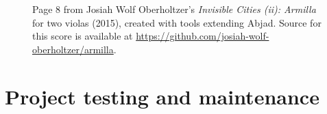 \documentclass{article}
\begin{document}
\begin{figure}
    \centering
    \caption{
        Page 8 from Josiah Wolf Oberholtzer's \emph{Invisible Cities (ii):
        Armilla} for two violas (2015), created with tools extending Abjad.
        Source for this score is available at
        \url{https://github.com/josiah-wolf-oberholtzer/armilla}. }
\end{figure}

\section{Project testing and maintenance} \label{sec:development}
\end{document}
